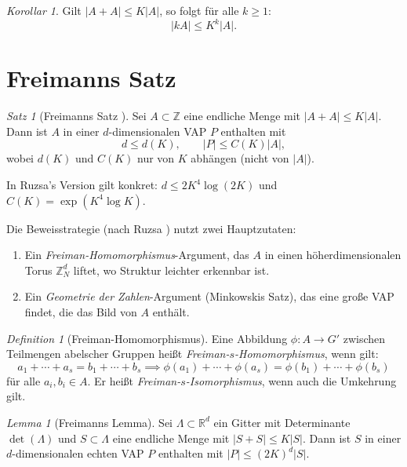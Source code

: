 \documentclass[12pt,a4paper]{amsart}
\theoremstyle{definition}
\theoremstyle{remark}
\newtheorem{satz}[theorem]{Satz}
\newtheorem{korollar}[theorem]{Korollar}
\newtheorem{lemma_de}[theorem]{Lemma}
\newtheorem{definition_de}[theorem]{Definition}
\newcommand{\Z}{\mathbb{Z}}
\newcommand{\R}{\mathbb{R}}
\begin{document}
\begin{korollar}\label{kor:plunnecke}
Gilt $|A + A| \leq K|A|$, so folgt für alle $k \geq 1$:
\[
  |kA| \leq K^k |A|.
\]
\end{korollar}

\section{Freimanns Satz}\label{sec:freiman}

\begin{satz}[Freimanns Satz \cite{Freiman1966,Ruzsa1994}]\label{satz:freiman}
Sei $A \subset \Z$ eine endliche Menge mit $|A + A| \leq K|A|$. Dann ist $A$
in einer $d$-dimensionalen VAP $P$ enthalten mit
\[
  d \leq d(K), \qquad |P| \leq C(K) |A|,
\]
wobei $d(K)$ und $C(K)$ nur von $K$ abhängen (nicht von $|A|$).

In Ruzsa's Version \cite{Ruzsa1994} gilt konkret:
$d \leq 2K^4 \log(2K)$ und $C(K) = \exp(K^4 \log K)$.
\end{satz}

Die Beweisstrategie (nach Ruzsa \cite{Ruzsa1994}) nutzt zwei Hauptzutaten:
\begin{enumerate}[label=(\roman*)]
  \item Ein \emph{Freiman-Homomorphismus}-Argument, das $A$ in einen
        höherdimensionalen Torus $\Z_N^d$ liftet, wo Struktur leichter erkennbar
        ist.
  \item Ein \emph{Geometrie der Zahlen}-Argument (Minkowskis Satz), das eine
        große VAP findet, die das Bild von $A$ enthält.
\end{enumerate}

\begin{definition_de}[Freiman-Homomorphismus]
Eine Abbildung $\phi: A \to G'$ zwischen Teilmengen abelscher Gruppen heißt
\emph{Freiman-$s$-Homomorphismus}, wenn gilt:
\[
  a_1 + \cdots + a_s = b_1 + \cdots + b_s \implies
  \phi(a_1) + \cdots + \phi(a_s) = \phi(b_1) + \cdots + \phi(b_s)
\]
für alle $a_i, b_i \in A$. Er heißt \emph{Freiman-$s$-Isomorphismus}, wenn auch
die Umkehrung gilt.
\end{definition_de}

\begin{lemma_de}[Freimanns Lemma]\label{lem:freiman_lemma}
Sei $\Lambda \subset \R^d$ ein Gitter mit Determinante $\det(\Lambda)$ und
$S \subset \Lambda$ eine endliche Menge mit $|S + S| \leq K|S|$. Dann ist $S$
in einer $d$-dimensionalen echten VAP $P$ enthalten mit $|P| \leq (2K)^d |S|$.
\end{lemma_de}
\end{document}
